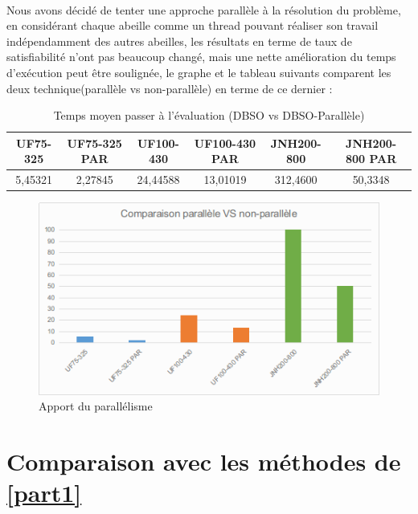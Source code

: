 	\paragraph{}
	Nous avons décidé de tenter une approche parallèle à la résolution du problème, en considérant chaque abeille comme un thread pouvant réaliser son travail indépendamment des autres abeilles, les résultats en terme de taux de satisfiabilité n'ont pas beaucoup changé, mais une nette amélioration du temps d'exécution peut être soulignée, le graphe et le tableau suivants comparent les deux technique(parallèle vs non-parallèle) en terme de ce dernier : 
	\begin{table}[H]
		\centering
		
		\begin{tabular}{|c|c|c|c|c|c|}
			\hline
			\textbf{UF75-325} & \textbf{UF75-325 PAR} & \textbf{UF100-430} & \textbf{UF100-430 PAR} & \textbf{JNH200-800} & \textbf{JNH200-800 PAR} \\ \hline
			5,45321           & 2,27845               & 24,44588           & 13,01019               & 312,4600            & 50,3348                 \\ \hline
		\end{tabular}
		\caption{Temps moyen passer à l'évaluation (DBSO vs DBSO-Parallèle)}
	\end{table}
	\begin{figure}[H]
		\centering
		\includegraphics[width=\textwidth]{images/parVSnonPar.png}
		\caption{Apport du parallélisme}
	\end{figure}
	\section{Comparaison avec les méthodes de \ref{part1}}
